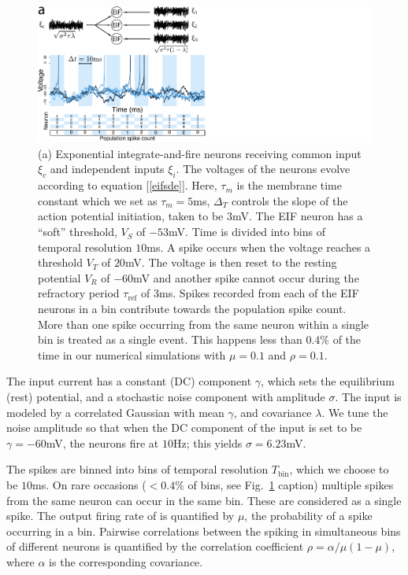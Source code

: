 \documentclass[%
 reprint,
 twocolumn,
 amsmath,amssymb,
 aps,
floatfix,
]{revtex4}
\begin{document}
\begin{figure}[t!]
\includegraphics{figures/EIF_schematic}
\caption{\label{fig:schematic} (a) Exponential integrate-and-fire neurons receiving common input $\xi_c$ and independent inputs $\xi_i$. The voltages of the neurons evolve according to equation [\ref{eifsde}]. Here, $\tau_m$ is the membrane time constant which we set as $\tau_m = 5$ms, $\Delta_T$ controls the slope of the action potential initiation, taken to be $3$mV. The EIF neuron has a ``soft'' threshold, $V_S$ of $-53$mV. Time is divided into bins of temporal resolution $10$ms. A spike occurs when the voltage reaches a threshold $V_T$ of $20$mV. The voltage is then reset to the resting potential $V_R$ of $-60$mV and another spike cannot occur during the refractory period $\tau_{\text{ref}}$ of $3$ms. Spikes recorded from each of the EIF neurons in a bin contribute towards the population spike count.  More than one spike occurring from the same neuron within a single bin is treated as a single event. This happens less than $0.4\%$ of the time in our numerical simulations with $\mu=0.1$ and $\rho=0.1$.
}
\end{figure}

The input current has a constant (DC) component $\gamma$, which sets the equilibrium (rest) potential, and a stochastic noise component with amplitude $\sigma$. The input is modeled by a correlated Gaussian with mean $\gamma$, and covariance $\lambda$.  We tune the noise amplitude so that when the DC component of the input is set to be $\gamma = -60$mV, the neurons fire at $10$Hz; this yields $\sigma = 6.23$mV.

The spikes are binned into bins of temporal resolution $T_\text{bin}$, which we choose to be $10$ms. On rare occasions ($<0.4\%$ of bins, see Fig.~\ref{fig:schematic} caption) multiple spikes from the same neuron can occur in the same bin. These are considered as a single spike.  The output firing rate of is quantified by $\mu$, the probability of a spike occurring in a bin.  Pairwise correlations between the spiking in simultaneous bins of different neurons is quantified by the correlation coefficient $\rho=\alpha/\mu(1-\mu)$, where $\alpha$ is the corresponding covariance.
\end{document}
